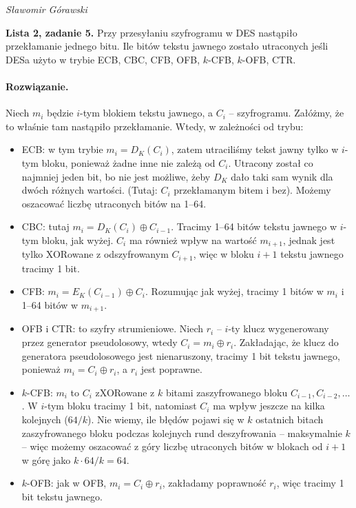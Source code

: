 \documentclass{article}
\newcommand{\xor}{\oplus}
\begin{document}
\begin{flushright}
\textit{Sławomir Górawski}
\end{flushright}
\bigskip

\noindent\textbf{Lista 2, zadanie 5.}
Przy przesyłaniu szyfrogramu w DES nastąpiło przekłamanie jednego bitu.
Ile bitów tekstu jawnego zostało utraconych jeśli DESa użyto w trybie
ECB, CBC, CFB, OFB, $k$-CFB, $k$-OFB, CTR.

\paragraph{Rozwiązanie.}
Niech $m_i$ będzie $i$-tym blokiem tekstu jawnego, a $C_i$ -- szyfrogramu.
Załóżmy, że to właśnie tam nastąpiło przekłamanie.
Wtedy, w zależności od trybu:

\begin{itemize}
    \item ECB: w tym trybie $m_i = D_K(C_i)$,
        zatem utraciliśmy tekst jawny tylko w $i$-tym bloku,
        ponieważ żadne inne nie zależą od $C_i$.
        Utracony został co najmniej jeden bit,
        bo nie jest możliwe, żeby $D_K$ dało taki sam wynik dla dwóch różnych wartości.
        (Tutaj: $C_i$ przekłamanym bitem i bez).
        Możemy oszacować liczbę utraconych bitów na 1--64.
    \item CBC: tutaj $m_i = D_K(C_i) \xor C_{i - 1}$.
        Tracimy 1--64 bitów tekstu jawnego w $i$-tym bloku, jak wyżej.
        $C_i$ ma również wpływ na wartość $m_{i + 1}$,
        jednak jest tylko XORowane z odszyfrowanym $C_{i + 1}$,
        więc w bloku $i + 1$ tekstu jawnego tracimy 1 bit.
    \item CFB: $m_i = E_K(C_{i - 1}) \xor C_i$.
        Rozumując jak wyżej, tracimy 1 bitów w $m_i$ i 1--64 bitów w $m_{i + 1}$.
    \item OFB i CTR: to szyfry strumieniowe.
        Niech $r_i$ -- $i$-ty klucz wygenerowany przez generator pseudolosowy,
        wtedy $C_i = m_i \xor r_i$.
        Zakładając, że klucz do generatora pseudolosowego jest nienaruszony,
        tracimy 1 bit tekstu jawnego, ponieważ $m_i = C_i \xor r_i$, a $r_i$ jest poprawne.
    \item $k$-CFB: $m_i$ to $C_i$ zXORowane
        z $k$ bitami zaszyfrowanego bloku $C_{i - 1}, C_{i - 2}, \dots$.
        W $i$-tym bloku tracimy 1 bit, natomiast $C_i$ ma wpływ jeszcze na kilka kolejnych ($64/k$).
        Nie wiemy, ile błędów pojawi się w $k$ ostatnich bitach zaszyfrowanego bloku
        podczas kolejnych rund deszyfrowania -- maksymalnie $k$ --
        więc możemy oszacować z góry liczbę utraconych bitów
        w blokach od $i + 1$ w górę jako $k \cdot 64/k = 64$.
    \item $k$-OFB: jak w OFB, $m_i = C_i \xor r_i$,
        zakładamy poprawność $r_i$, więc tracimy 1 bit tekstu jawnego.
\end{itemize}
\end{document}

